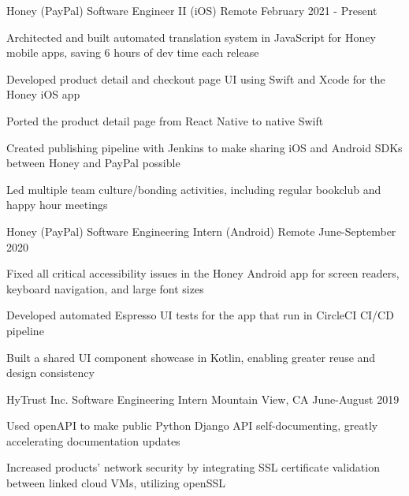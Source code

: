 \documentclass[11pt, a4paper]{awesome-cv}
\begin{document}
\makecvheader


\begin{cventries}

  \cventry
    {Honey (PayPal)}
    {Software Engineer II (iOS)}
    {Remote}
    {February 2021 - Present}
    {
        \begin{cvitems}
            \item {Architected and built automated translation system in JavaScript for Honey mobile apps, saving 6 hours of dev time each release}
            \item {Developed product detail and checkout page UI using Swift and Xcode for the Honey iOS app}
            \item {Ported the product detail page from React Native to native Swift}
            \item {Created publishing pipeline with Jenkins to make sharing iOS and Android SDKs between Honey and PayPal possible}
            \item {Led multiple team culture/bonding activities, including regular bookclub and happy hour meetings}
        \end{cvitems}
    }

  \cventry
    {Honey (PayPal)}
    {Software Engineering Intern (Android)}
    {Remote}
    {June-September 2020}
    {
        \begin{cvitems}
            \item {Fixed all critical accessibility issues in the Honey Android app for screen readers, keyboard navigation, and large font sizes}
            \item {Developed automated Espresso UI tests for the app that run in CircleCI CI/CD pipeline}
            \item {Built a shared UI component showcase in Kotlin, enabling greater reuse and design consistency}
        \end{cvitems}
    }

  \cventry
    {HyTrust Inc.}
    {Software Engineering Intern}
    {Mountain View, CA}
    {June-August 2019}
    {
      \begin{cvitems}
      	\item {Used openAPI to make public Python Django API self-documenting, greatly accelerating documentation updates}
	      \item {Increased products' network security by integrating SSL certificate validation between linked cloud VMs, utilizing openSSL}
      \end{cvitems}
    }


\end{cventries}
\end{document}
